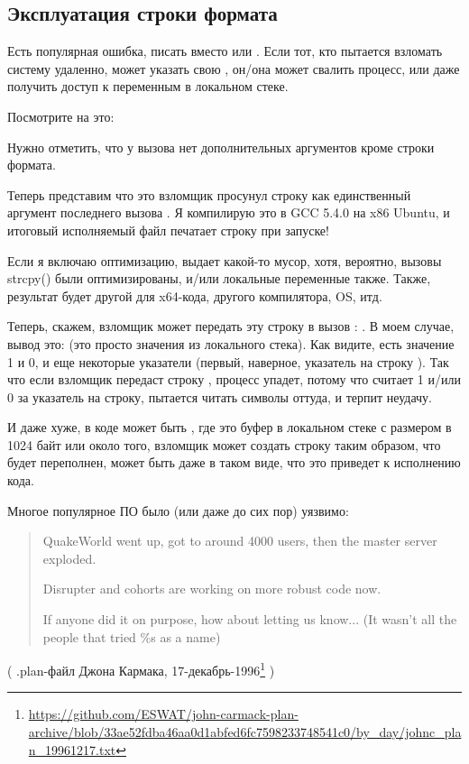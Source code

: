 \subsection{Эксплуатация строки формата}

Есть популярная ошибка, писать  вместо  или .
Если тот, кто пытается взломать систему удаленно, может указать свою , он/она может свалить процесс,
или даже получить доступ к переменным в локальном стеке.

Посмотрите на это:



Нужно отметить, что у вызова \printf нет дополнительных аргументов кроме строки формата.

Теперь представим что это взломщик просунул строку  как единственный аргумент последнего вызова \printf{}.
Я компилирую это в GCC 5.4.0 на x86 Ubuntu, и итоговый исполняемый файл печатает строку  при запуске!

Если я включаю оптимизацию, \printf выдает какой-то мусор, хотя, вероятно, вызовы strcpy() были оптимизированы,
и/или локальные переменные также.
Также, результат будет другой для x64-кода, другого компилятора, \ac{OS}, итд.

Теперь, скажем, взломщик может передать эту строку в вызов \printf{}: .
В моем случае, вывод это:  (это просто значения из локального стека).
Как видите, есть значение 1 и 0, и еще некоторые указатели (первый, наверное, указатель на строку ).
Так что если взломщик передаст строку , процесс упадет, потому что \printf считает 1 и/или 0
за указатель на строку, пытается читать символы оттуда, и терпит неудачу.

И даже хуже, в коде может быть , где  это буфер в локальном стеке
с размером в 1024 байт или около того, взломщик может создать строку  таким образом, что  будет
переполнен, может быть даже в таком виде, что это приведет к исполнению кода.

Многое популярное ПО было (или даже до сих пор) уязвимо:

\begin{framed}
\begin{quotation}
QuakeWorld went up, got to around 4000 users, then the master server exploded.

Disrupter and cohorts are working on more robust code now.

If anyone did it on purpose, how about letting us know... (It wasn't all the people that tried \%s as a name)
\end{quotation}
\end{framed}
( .plan-файл Джона Кармака, 17-декабрь-1996\footnote{\url{https://github.com/ESWAT/john-carmack-plan-archive/blob/33ae52fdba46aa0d1abfed6fc7598233748541c0/by_day/johnc_plan_19961217.txt}} )

